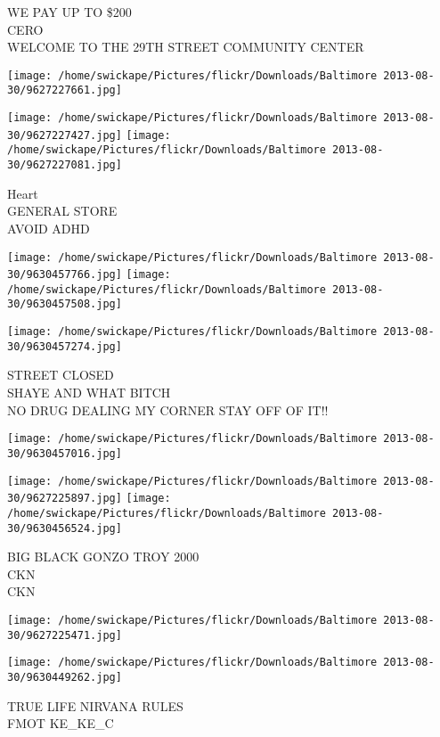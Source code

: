 \documentclass[10pt,letterpaper]{article}
\begin{document}
WE PAY UP TO \$200\\
CERO\\
WELCOME TO THE 29TH STREET COMMUNITY CENTER
\pagebreak

\texttt{[image: /home/swickape/Pictures/flickr/Downloads/Baltimore 2013-08-30/9627227661.jpg]}

\vspace{0.25in}
\texttt{[image: /home/swickape/Pictures/flickr/Downloads/Baltimore 2013-08-30/9627227427.jpg]}
\texttt{[image: /home/swickape/Pictures/flickr/Downloads/Baltimore 2013-08-30/9627227081.jpg]}

Heart\\
GENERAL STORE\\
AVOID ADHD
\pagebreak

\texttt{[image: /home/swickape/Pictures/flickr/Downloads/Baltimore 2013-08-30/9630457766.jpg]}
\texttt{[image: /home/swickape/Pictures/flickr/Downloads/Baltimore 2013-08-30/9630457508.jpg]}

\texttt{[image: /home/swickape/Pictures/flickr/Downloads/Baltimore 2013-08-30/9630457274.jpg]}

STREET CLOSED\\
SHAYE AND WHAT BITCH\\
NO DRUG DEALING MY CORNER STAY OFF OF IT!!
\pagebreak

\texttt{[image: /home/swickape/Pictures/flickr/Downloads/Baltimore 2013-08-30/9630457016.jpg]}

\vspace{0.25in}
\texttt{[image: /home/swickape/Pictures/flickr/Downloads/Baltimore 2013-08-30/9627225897.jpg]}
\texttt{[image: /home/swickape/Pictures/flickr/Downloads/Baltimore 2013-08-30/9630456524.jpg]}

BIG BLACK GONZO TROY 2000\\
CKN\\
CKN
\pagebreak

\texttt{[image: /home/swickape/Pictures/flickr/Downloads/Baltimore 2013-08-30/9627225471.jpg]}

\vspace{0.25in}
\texttt{[image: /home/swickape/Pictures/flickr/Downloads/Baltimore 2013-08-30/9630449262.jpg]}

TRUE LIFE NIRVANA RULES\\
FMOT KE\_KE\_C
\pagebreak
\end{document}
